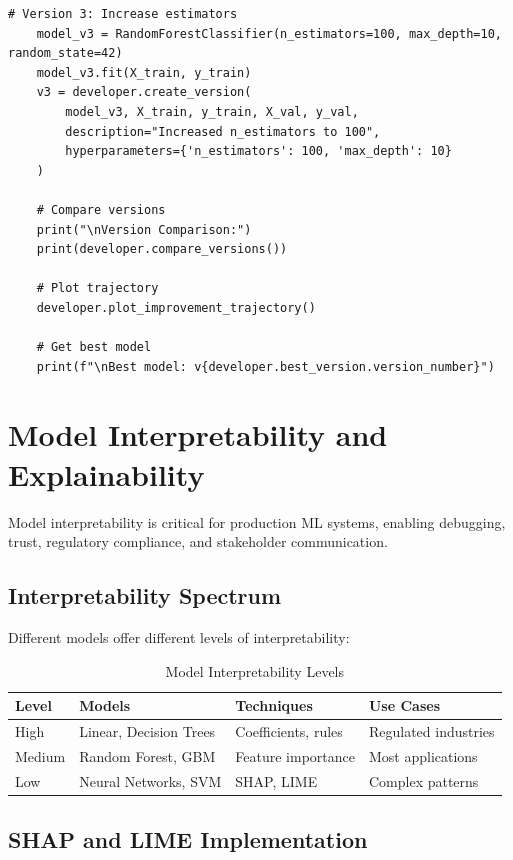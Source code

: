 \begin{lstlisting}[style=python, caption={Iterative Model Development Framework}]
    # Version 3: Increase estimators
    model_v3 = RandomForestClassifier(n_estimators=100, max_depth=10, random_state=42)
    model_v3.fit(X_train, y_train)
    v3 = developer.create_version(
        model_v3, X_train, y_train, X_val, y_val,
        description="Increased n_estimators to 100",
        hyperparameters={'n_estimators': 100, 'max_depth': 10}
    )

    # Compare versions
    print("\nVersion Comparison:")
    print(developer.compare_versions())

    # Plot trajectory
    developer.plot_improvement_trajectory()

    # Get best model
    print(f"\nBest model: v{developer.best_version.version_number}")
\end{lstlisting}

\section{Model Interpretability and Explainability}

Model interpretability is critical for production ML systems, enabling debugging, trust, regulatory compliance, and stakeholder communication.

\subsection{Interpretability Spectrum}

Different models offer different levels of interpretability:

\begin{table}[h]
\centering
\caption{Model Interpretability Levels}
\label{tab:interpretability_levels}
\begin{tabular}{|l|l|l|l|}
\hline
\textbf{Level} & \textbf{Models} & \textbf{Techniques} & \textbf{Use Cases} \\
\hline
High & Linear, Decision Trees & Coefficients, rules & Regulated industries \\
Medium & Random Forest, GBM & Feature importance & Most applications \\
Low & Neural Networks, SVM & SHAP, LIME & Complex patterns \\
\hline
\end{tabular}
\end{table}

\subsection{SHAP and LIME Implementation}

